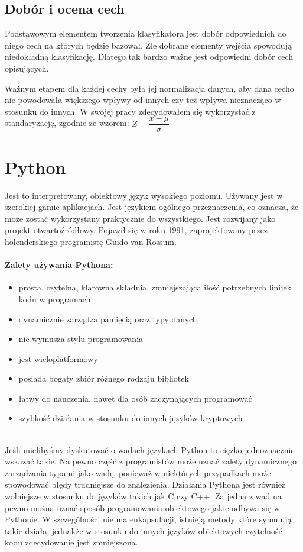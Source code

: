 \documentclass[a4paper,12pt,twoside,openany]{report}
\begin{document}
\subsection{Dobór i ocena cech}
Podstawowym elementem tworzenia klasyfikatora jest dobór odpowiednich do niego cech na których będzie bazował. Źle dobrane elementy wejścia spowodują niedokładną klasyfikację. Dlatego tak bardzo ważne jest odpowiedni dobór cech opisujących.

Ważnym etapem dla każdej cechy była jej normalizacja danych, aby dana cecho nie powodowała większego wpływy od innych czy też wpływa nieznacząco w stosunku do innych. W swojej pracy zdecydowałem się wykorzystać z standaryzację, zgodnie ze wzorem: $ Z = \dfrac{x - \mu}{\sigma} $

\section{Python}
Jest to interpretowany, obiektowy język wysokiego poziomu. Używany jest w szerokiej gamie  aplikacjach. Jest językiem ogólnego przeznaczenia, co oznacza, że może zostać wykorzystany praktycznie do wszystkiego. Jest rozwijany jako projekt otwartoźródłowy. Pojawił się w roku 1991, zaprojektowany przez holenderskiego programistę Guido van Rossum.

\paragraph{Zalety używania Pythona:}
\begin{itemize} 
	\item prosta, czytelna, klarowna składnia, zmniejszająca ilość potrzebnych linijek kodu w programach
	\item dynamicznie zarządza pamięcią oraz typy danych
	\item nie wymusza stylu programowania
	\item jest wieloplatformowy
	\item posiada bogaty zbiór różnego rodzaju bibliotek
	\item łatwy do nauczenia, nawet dla osób zaczynających programować
	\item szybkość działania w stosunku do innych języków kryptowych
\end{itemize} 
\mbox{} \\
Jeśli mielibyśmy dyskutować o wadach językach Python to ciężko jednoznacznie wskazać takie. Na pewno część z programistów może uznać zalety dynamicznego zarządzania typami jako wadę, ponieważ w niektórych przypadkach może spowodować błędy trudniejsze do znalezienia. Działania Pythona jest również wolniejsze w stosunku do języków takich jak C czy C++.  Za jedną z wad na pewno można uznać sposób programowania obiektowego jakie odbywa się w Pythonie. W szczególności nie ma enkapsulacji, istnieją metody które symulują takie działa, jednakże w stosunku do innych języków  obiektowych czytelność kodu zdecydowanie jest zmniejszona.
\end{document}
